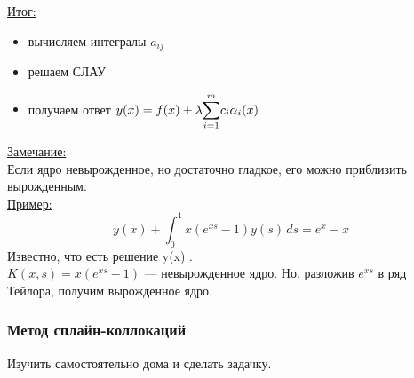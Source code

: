 \underline{Итог:} \begin{itemize}
    \item вычисляем интегралы $a_{ij}$
    \item решаем СЛАУ
    \item получаем ответ \(y(x)=f(x)+\lambda \mathlarger{\sum}_{i=1}^m c_i\alpha_i(x)\)
\end{itemize}
\underline{Замечание:}\\
Если ядро невырожденное, но достаточно гладкое, его можно приблизить вырожденным.\\
\underline{Пример:}
\[y(x)+\int_0^1x(e^{xs}-1)y(s)\,ds=e^x-x\]
Известно, что есть решение y(x) .\\
\(K(x,s)=x(e^{xs}-1)\) --- невырожденное ядро. Но, разложив $e^{xs}$ в ряд Тейлора, получим вырожденное ядро.
\subsubsection{Метод сплайн-коллокаций}
Изучить самостоятельно дома и сделать задачку.
